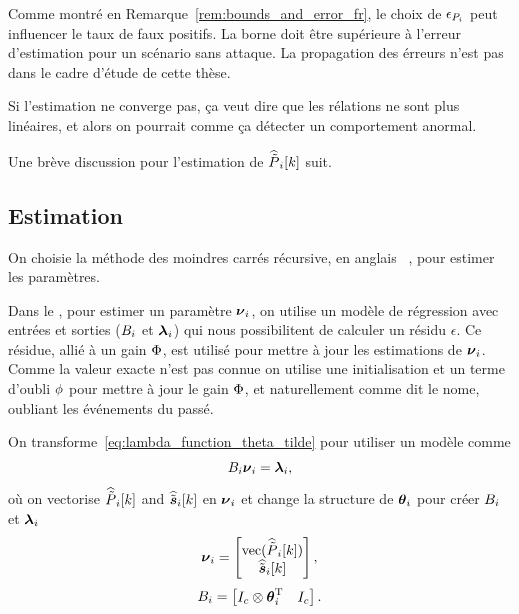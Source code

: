\documentclass[../main.tex]{subfiles}
\begin{document}
\begin{remark}
  Comme montré en Remarque~\ref{rem:bounds_and_error_fr}, le choix de $\epsilon_{{P}_{i}}$ peut influencer le taux de faux positifs.
  La borne doit être supérieure à l'erreur d'estimation pour un scénario sans attaque.
  La propagation des érreurs n'est pas dans le cadre d'étude de cette thèse.
\end{remark}

\begin{remark}
  Si l'estimation ne converge pas, ça veut dire que les rélations ne sont plus linéaires, et alors on pourrait comme ça détecter un comportement anormal.
\end{remark}

Une brève discussion pour l'estimation de $\widehat{\tilde{P}}_{i}[k]$ suit.

\subsection{Estimation}\label{sec:about-estimation_fr}
On choisie la méthode des moindres carrés récursive, en anglais \RLS{}~\cite{AstroemWittenmark1989}, pour estimer les paramètres.

Dans le \RLS{}, pour estimer un paramètre ${\boldsymbol{\nu}_{i}}$, on utilise un modèle de régression avec entrées et sorties (${B_i}$ et ${\boldsymbol{\lambda}_{i}}$) qui nous possibilitent de calculer un résidu $\epsilon$.
Ce résidue, allié à un gain ${\Phi}$, est utilisé pour mettre à jour les estimations de ${\boldsymbol{\nu}_{i}}$.
Comme la valeur exacte n'est pas connue on utilise une initialisation et un terme d'oubli ${\phi}$ pour mettre à jour le gain ${\Phi}$, et naturellement comme dit le nome, oubliant les événements du passé.

On transforme~\eqref{eq:lambda_function_theta_tilde} pour utiliser un modèle comme
\begin{equation}
  {B_i}{\boldsymbol{\nu}_{i}}={\boldsymbol{\lambda}_{i}},
\end{equation}
où on vectorise $\widehat{\tilde{P}}_{i}[k]$ and $\widehat{\tilde{\boldsymbol{s}}}_{i}[k]$ en ${\boldsymbol{\nu}_{i}}$ et change la structure de $\boldsymbol{\theta}_{i}$ pour créer ${B_i}$ et ${\boldsymbol{\lambda}_{i}}$
\begin{equation}
  {\boldsymbol{\nu}_{i}}=\left[
    \begin{matrix}
      \mathrm{vec} (\widehat{\tilde{P}}_{i}[k])\\
      \widehat{\tilde{\boldsymbol{s}}}_{i}[k]\\
    \end{matrix}
  \right],
\end{equation}
\begin{equation}
  {B_i}=\left[
    \begin{matrix}
      I_{c}\otimes\boldsymbol{\theta}_{i}^{\mathrm{T}}&I_{c}\\
    \end{matrix}
  \right].
\end{equation}
\end{document}
